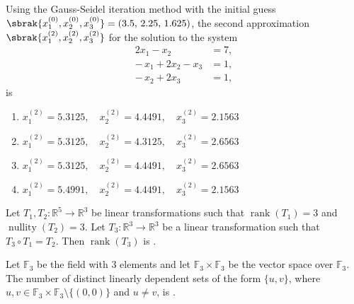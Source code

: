 \item Using the Gauss-Seidel iteration method with the initial guess
$\sbrak{x_1^{(0)},x_2^{(0)},x_3^{(0)}}=(3.5,\,2.25,\,1.625)$,
the second approximation $\sbrak{x_1^{(2)},x_2^{(2)},x_3^{(2)}}$ for the solution to the system
\begin{align*}
2x_1 - x_2 &= 7,\\
-\,x_1 + 2x_2 - x_3 &= 1,\\
-\,x_2 + 2x_3 &= 1,
\end{align*}
is
\hfill{}
\begin{enumerate}[itemsep=1ex]
\item $x_1^{(2)}=5.3125,\quad x_2^{(2)}=4.4491,\quad x_3^{(2)}=2.1563$
\item $x_1^{(2)}=5.3125,\quad x_2^{(2)}=4.3125,\quad x_3^{(2)}=2.6563$
\item $x_1^{(2)}=5.3125,\quad x_2^{(2)}=4.4491,\quad x_3^{(2)}=2.6563$
\item $x_1^{(2)}=5.4991,\quad x_2^{(2)}=4.4491,\quad x_3^{(2)}=2.1563$
\end{enumerate}
\item Let $T_{1},T_{2}:\mathbb{R}^{5}\to\mathbb{R}^{3}$ be linear transformations such that
$\operatorname{rank}(T_{1})=3$ and $\operatorname{nullity}(T_{2})=3$.  
Let $T_{3}:\mathbb{R}^{3}\to\mathbb{R}^{3}$ be a linear transformation such that
$T_{3}\circ T_{1}=T_{2}$.  
Then $\operatorname{rank}(T_{3})$ is \underline{\hspace{2.8cm}}.
\hfill{}
\item Let $\mathbb{F}_{3}$ be the field with $3$ elements and let
$\mathbb{F}_{3}\times\mathbb{F}_{3}$ be the vector space over $\mathbb{F}_{3}$.
The number of distinct linearly dependent sets of the form $\{u,v\}$, where
$u,v\in\mathbb{F}_{3}\times\mathbb{F}_{3}\setminus\{(0,0)\}$ and $u\ne v$, is
\underline{\hspace{2.8cm}}.
\hfill{}

